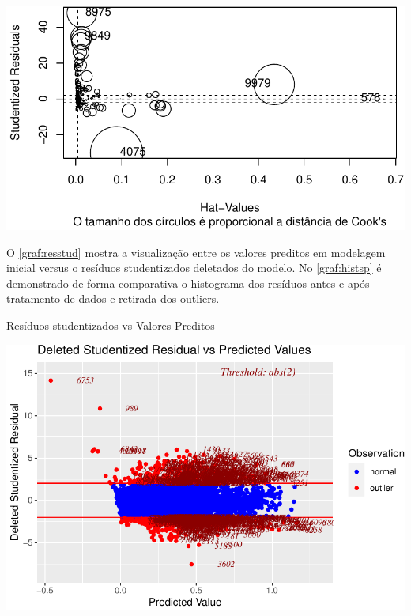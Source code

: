 \documentclass[
  12pt,
  12pt,
  openright,
  oneside,
  a4paper,
  chapter=TITLE,
  section=TITLE,
  subsection=TITLE,
  subsubsection=TITLE,
  portugues,
  sumario=tradicional]{abntex2}
\begin{document}
\begin{apendicesenv}
\begin{grafico}[!htbp]
\begin{center}\includegraphics{12-exportedfigures/influence.plot-1} \end{center}
\vspace{-3mm}
\label{graf:influence}
\vspace{-2mm}
\end{grafico}

O \autoref{graf:resstud} mostra a visualização entre os valores preditos em modelagem inicial versus o resíduos studentizados deletados do modelo. No \autoref{graf:histsp} é demonstrado de forma comparativa o histograma dos resíduos antes e após tratamento de dados e retirada dos outliers. 

\begin{grafico}
\vspace{20pt}
\caption{Resíduos studentizados vs Valores Preditos}
\vspace{-4mm}

\begin{center}\includegraphics{12-exportedfigures/fit.01.graf-1} \end{center}
\vspace{-3mm}
\label{graf:resstud}
\vspace{-2mm}
\end{grafico}


\end{apendicesenv}
\end{document}

